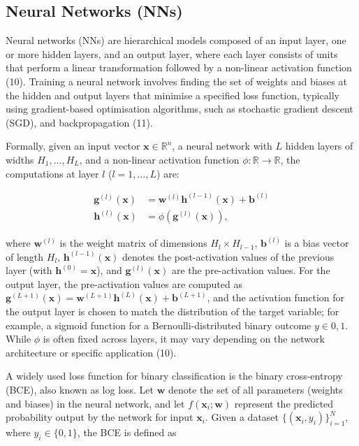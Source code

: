 \documentclass[
  a4paper,
]{scrreprt}
\begin{document}
\subsection{Neural Networks (NNs)}\label{neural-networks-nns}

Neural networks (NNs) are hierarchical models composed of an input
layer, one or more hidden layers, and an output layer, where each layer
consists of units that perform a linear transformation followed by a
non-linear activation function (10). Training a neural network involves
finding the set of weights and biases at the hidden and output layers
that minimise a specified loss function, typically using gradient-based
optimisation algorithms, such as stochastic gradient descent (SGD), and
backpropagation (11).

Formally, given an input vector \(\mathbf{x} \in \mathbb{R}^n\), a
neural network with \(L\) hidden layers of widths \(H_1, \dots, H_L\),
and a non-linear activation function
\(\phi: \mathbb{R} \rightarrow \mathbb{R}\), the computations at layer
\(l\) (\(l = 1, \dots, L\)) are:

\[
\begin{aligned}
\mathbf{g}^{(l)}(\mathbf{x}) &= \mathbf{w}^{(l)} \mathbf{h}^{(l-1)}(\mathbf{x}) + \mathbf{b}^{(l)} \\
\mathbf{h}^{(l)}(\mathbf{x}) &= \phi\left(\mathbf{g}^{(l)}(\mathbf{x})\right),
\end{aligned}
\]

where \(\mathbf{w}^{(l)}\) is the weight matrix of dimensions
\(H_l \times H_{l-1}\), \(\mathbf{b}^{(l)}\) is a bias vector of length
\(H_l\), \(\mathbf{h}^{(l-1)}(\mathbf{x})\) denotes the post-activation
values of the previous layer (with \(\mathbf{h}^{(0)} = \mathbf{x}\)),
and \(\mathbf{g}^{(l)}(\mathbf{x})\) are the pre-activation values. For
the output layer, the pre-activation values are computed as
\(\mathbf{g}^{(L+1)}(\mathbf{x}) = \mathbf{w}^{(L+1)} \mathbf{h}^{(L)}(\mathbf{x}) + \mathbf{b}^{(L+1)}\),
and the activation function for the output layer is chosen to match the
distribution of the target variable; for example, a sigmoid function for
a Bernoulli-distributed binary outcome \(y \in {0,1}\). While \(\phi\)
is often fixed across layers, it may vary depending on the network
architecture or specific application (10).

A widely used loss function for binary classification is the binary
cross-entropy (BCE), also known as log loss. Let \(\mathbf{w}\) denote
the set of all parameters (weights and biases) in the neural network,
and let \(f(\mathbf{x}_i; \mathbf{w})\) represent the predicted
probability output by the network for input \(\mathbf{x}_i\). Given a
dataset \(\{(\mathbf{x}_i, y_i)\}_{i=1}^N\), where \(y_i \in \{0,1\}\),
the BCE is defined as
\end{document}
